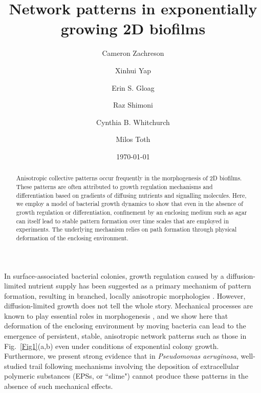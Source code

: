 \documentclass[aps,prl,numerical,reprint,superscriptaddress,showpacs]{revtex4-1}
\begin{document}
\title{Network patterns in exponentially growing 2D biofilms}

\author{Cameron Zachreson}

\author{Xinhui Yap}

\author{Erin S. Gloag}

\author{Raz Shimoni}

\author{Cynthia B. Whitchurch}

\author{Milos Toth}

\begin{abstract}
Anisotropic collective patterns occur frequently in the morphogenesis of 2D biofilms. These patterns are often attributed to growth regulation mechanisms and differentiation based on gradients of diffusing nutrients and signalling molecules. Here, we employ a model of bacterial growth dynamics to show that even in the absence of growth regulation or differentiation, confinement by an enclosing medium such as agar can itself lead to stable pattern formation over time scales that are employed in experiments. The underlying mechanism relies on path formation through physical deformation of the enclosing environment. 

\end{abstract}

\date{\today}


\maketitle

In surface-associated bacterial colonies, growth regulation caused by a diffusion-limited nutrient supply has been suggested as a primary mechanism of pattern formation, resulting in branched, locally anisotropic morphologies \cite{ben1994generic,farrell2013mechanically}. However, diffusion-limited growth does not tell the whole story. Mechanical processes are known to play essential roles in morphogenesis \cite{howard2011turing}, and we show here that deformation of the enclosing environment by moving bacteria can lead to the emergence of persistent, stable, anisotropic network patterns such as those in Fig.~\ref{Fig1}(a,b) even under conditions of exponential colony growth. Furthermore, we present strong evidence that in {\it Pseudomonas aeruginosa}, well-studied trail following mechanisms involving the deposition of extracellular polymeric substances (EPSs, or ``slime") cannot produce these patterns in the absence of such mechanical effects.
\end{document}
